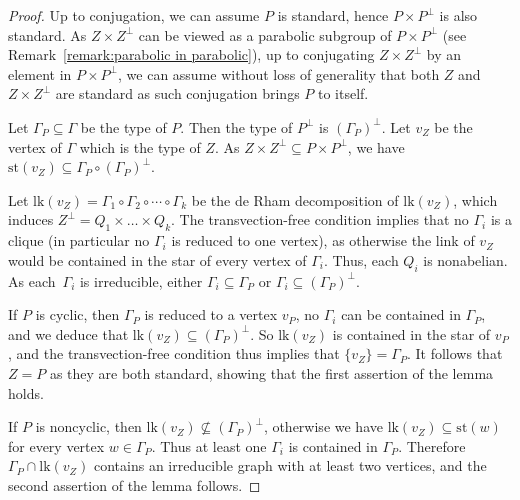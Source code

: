 \documentclass[JEP,XML,SOM,Unicode,NoFloatCountersInSection,published]{cedram}
\theoremstyle{plain}
\theoremstyle{definition}
\newcommand{\lk}{\mathrm{lk}}
\newcommand{\st}{\mathrm{st}}
\begin{document}
\begin{proof}
Up to conjugation, we can assume $P$ is standard, hence $P\times P^\perp$ is also standard. As $Z\times Z^\perp$ can be viewed as a parabolic subgroup of $P\times P^\perp$ (see Remark~\ref{remark:parabolic in parabolic}), up to conjugating $Z\times Z^\perp$ by an element in $P\times P^\perp$, we can assume without loss of generality that both $Z$ and $Z\times Z^\perp$ are standard as such conjugation brings $P$ to itself.

Let $\Gamma_P\subseteq\Gamma$ be the type of $P$. Then the type of $P^\perp$ is $(\Gamma_P)^\perp$. Let $v_Z$ be the vertex of $\Gamma$ which is the type of $Z$. As $Z\times Z^{\perp}\subseteq P\times P^{\perp}$, we have $\st(v_Z)\subseteq \Gamma_P\circ (\Gamma_P)^\perp$.

Let $\lk(v_Z)=\Gamma_1\circ\Gamma_2\circ\cdots\circ\Gamma_k$ be the de Rham decomposition of $\lk(v_Z)$, which induces $Z^{\perp}=Q_1\times\dots \times Q_k$. The transvection-free condition implies that no $\Gamma_i$ is a clique (in particular no $\Gamma_i$ is reduced to one vertex), as otherwise the link of $v_Z$ would be contained in the star of every vertex of $\Gamma_i$. Thus, each $Q_i$ is nonabelian. As each~$\Gamma_i$ is irreducible, either $\Gamma_i\subseteq\Gamma_P$ or $\Gamma_i\subseteq (\Gamma_{P})^\perp$.

If $P$ is cyclic, then $\Gamma_P$ is reduced to a vertex $v_P$, no $\Gamma_i$ can be contained in $\Gamma_P$, and we deduce that $\lk(v_Z)\subseteq (\Gamma_P)^\perp$. So $\lk(v_Z)$ is contained in the star of $v_P$, and the transvection-free condition thus implies that $\{v_Z\}=\Gamma_P$. It follows that $Z=P$ as they are both standard, showing that the first assertion of the lemma holds.

If $P$ is noncyclic, then $\lk(v_Z)\nsubseteq (\Gamma_P)^\perp$, otherwise we have $\lk(v_Z)\subseteq \st(w)$ for every vertex $w\in\Gamma_P$. Thus at least one $\Gamma_i$ is contained in $\Gamma_P$. Therefore $\Gamma_P\cap\lk(v_Z)$ contains an irreducible graph with at least two vertices, and the second assertion of the lemma follows.
\end{proof}

\label{sec:full-support}
\end{document}
